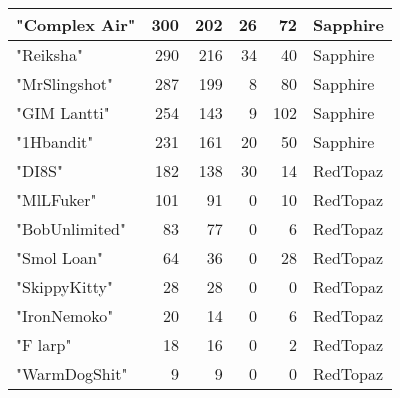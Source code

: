 \documentclass{article}
\begin{document}
\begin{table}[htbp]
\begin{tabular}{|l|r|r|r|r|l|}
"Complex Air" & 300 & 202 & 26 & 72 & Sapphire \\ \hline
"Reiksha" & 290 & 216 & 34 & 40 & Sapphire \\ \hline
"MrSlingshot" & 287 & 199 & 8 & 80 & Sapphire \\ \hline
"GIM Lantti" & 254 & 143 & 9 & 102 & Sapphire \\ \hline
"1Hbandit" & 231 & 161 & 20 & 50 & Sapphire \\ \hline
"DI8S" & 182 & 138 & 30 & 14 & RedTopaz \\ \hline
"MlLFuker" & 101 & 91 & 0 & 10 & RedTopaz \\ \hline
"BobUnlimited" & 83 & 77 & 0 & 6 & RedTopaz \\ \hline
"Smol Loan" & 64 & 36 & 0 & 28 & RedTopaz \\ \hline
"SkippyKitty" & 28 & 28 & 0 & 0 & RedTopaz \\ \hline
"IronNemoko" & 20 & 14 & 0 & 6 & RedTopaz \\ \hline
"F larp" & 18 & 16 & 0 & 2 & RedTopaz \\ \hline
"WarmDogShit" & 9 & 9 & 0 & 0 & RedTopaz \\ \hline
\end{tabular}
\end{table}
\end{document}
